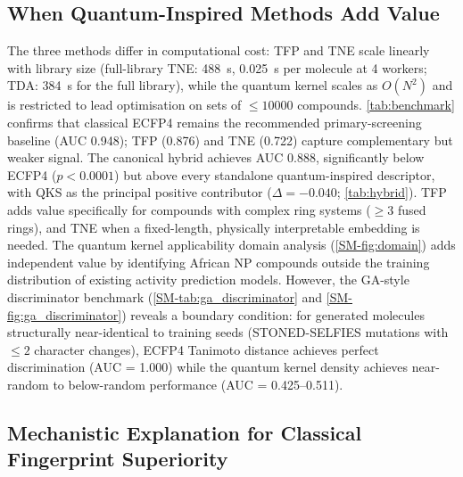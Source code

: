 \documentclass[11pt,a4paper]{article}
\begin{document}
\subsection{When Quantum-Inspired Methods Add Value}

The three methods differ in computational cost: TFP and TNE scale linearly with library size (full-library TNE: \SI{488}{\second}, \SI{0.025}{\second} per molecule at 4 workers; TDA: \SI{384}{\second} for the full library), while the quantum kernel scales as $O(N^2)$ and is restricted to lead optimisation on sets of $\leq \num{10000}$ compounds. \cref{tab:benchmark} confirms that classical ECFP4 remains the recommended primary-screening baseline (AUC \num{0.948}); TFP (0.876) and TNE (0.722) capture complementary but weaker signal. The canonical hybrid achieves AUC \num{0.888}, significantly below ECFP4 ($p < 0.0001$) but above every standalone quantum-inspired descriptor, with QKS as the principal positive contributor ($\Delta = -0.040$; \cref{tab:hybrid}). TFP adds value specifically for compounds with complex ring systems ($\geq 3$ fused rings), and TNE when a fixed-length, physically interpretable embedding is needed. The quantum kernel applicability domain analysis (\cref{SM-fig:domain}) adds independent value by identifying African NP compounds outside the training distribution of existing activity prediction models. However, the GA-style discriminator benchmark (\cref{SM-tab:ga_discriminator} and \cref{SM-fig:ga_discriminator}) reveals a boundary condition: for generated molecules structurally near-identical to training seeds (STONED-SELFIES mutations with $\leq 2$ character changes), ECFP4 Tanimoto distance achieves perfect discrimination (AUC = \num{1.000}) while the quantum kernel density achieves near-random to below-random performance (AUC = \numrange{0.425}{0.511}).

\subsection{Mechanistic Explanation for Classical Fingerprint Superiority}
\end{document}
